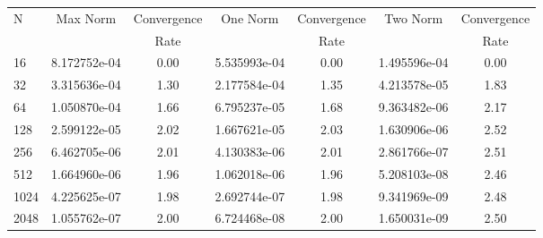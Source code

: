 \documentclass[12pt]{article}
\begin{document}
	\begin{tabular}{l|c|c|c|c|c|c}
		N&Max Norm&Convergence&One Norm&Convergence&Two Norm&Convergence\\
		&&Rate&&Rate&&Rate\\
		\hline
		16&8.172752e-04&0.00&5.535993e-04&0.00&1.495596e-04&0.00\\
		\hline
		32&3.315636e-04&1.30&2.177584e-04&1.35&4.213578e-05&1.83\\
		\hline
		64&1.050870e-04&1.66&6.795237e-05&1.68&9.363482e-06&2.17\\
		\hline
		128&2.599122e-05&2.02&1.667621e-05&2.03&1.630906e-06&2.52\\
		\hline
		256&6.462705e-06&2.01&4.130383e-06&2.01&2.861766e-07&2.51\\
		\hline
		512&1.664960e-06&1.96&1.062018e-06&1.96&5.208103e-08&2.46\\
		\hline
		1024&4.225625e-07&1.98&2.692744e-07&1.98&9.341969e-09&2.48\\
		\hline
		2048&1.055762e-07&2.00&6.724468e-08&2.00&1.650031e-09&2.50\\
	\end{tabular}
\end{document}

